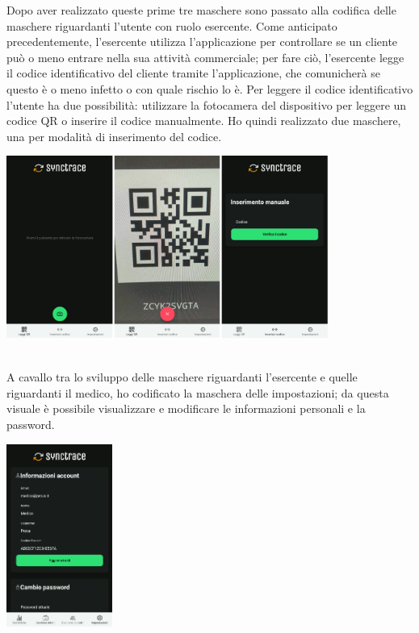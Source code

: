 Dopo aver realizzato queste prime tre maschere sono passato alla codifica delle maschere riguardanti l'utente con ruolo esercente. Come anticipato precedentemente, l'esercente utilizza l'applicazione per controllare se un cliente può o meno entrare nella sua attività commerciale; per fare ciò, l'esercente legge il codice identificativo del cliente tramite l'applicazione, che comunicherà se questo è o meno infetto o con quale rischio lo è. Per leggere il codice identificativo l'utente ha due possibilità: utilizzare la fotocamera del dispositivo per leggere un codice QR o inserire il codice manualmente. Ho quindi realizzato due maschere, una per modalità di inserimento del codice.\\

\begin{minipage}{\linewidth}
  \centering
    \includegraphics[height=6cm]{immagini/app/es}
\end{minipage}\\

A cavallo tra lo sviluppo delle maschere riguardanti l'esercente e quelle riguardanti il medico, ho codificato la maschera delle impostazioni; da questa visuale è possibile visualizzare e modificare le informazioni personali e la password. \\

\begin{minipage}{\linewidth}
  \centering
    \includegraphics[height=6cm]{immagini/app/settings}
\end{minipage}\\


